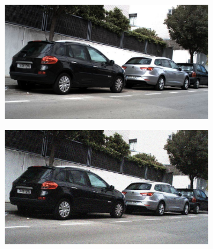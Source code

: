 \documentclass[a4paper]{ctexart}
\begin{document}
\begin{figure}[htbp]
\begin{subfigure}{0.08\textwidth}
			\label{fig：Gamma=0.4, Gauss Noise = 1.0}
		\end{subfigure} \\
		
		\vspace{-15pt}
		
		\begin{subfigure}{0.02\textwidth}
			\captionsetup{font=scriptsize}
			\caption*{}
			\vspace{-2pt}
		\end{subfigure}
		\begin{subfigure}{0.08\textwidth}
			\captionsetup{font=scriptsize}
			\includegraphics[width=\linewidth]{picture/Edge Detection/degrade/RGB_001 Gamma=0.5, Gauss Noise=0.0}
			\label{fig: Gamma=0.5, Gauss Noise = 0.0}
		\end{subfigure}
		\begin{subfigure}{0.08\textwidth}
			\captionsetup{font=scriptsize}
			\includegraphics[width=\linewidth]{picture/Edge Detection/degrade/RGB_001 Gamma=0.5, Gauss Noise=0.1}

\end{subfigure}
\end{figure}
\end{document}
